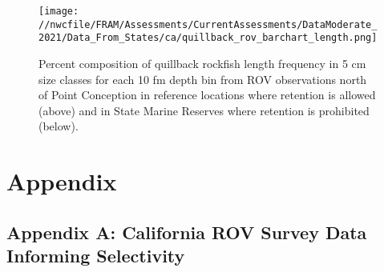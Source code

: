 \documentclass[11pt,
  english,
  a4paper,
]{article}
\begin{document}
\tagmcend\tagstructend


\begin{figure}
\centering
\texttt{[image: //nwcfile/FRAM/Assessments/CurrentAssessments/DataModerate\_2021/Data\_From\_States/ca/quillback\_rov\_barchart\_length.png]}
\caption{Percent composition of quillback rockfish length frequency in 5 cm size classes for each 10 fm depth bin from ROV observations north of Point Conception in reference locations where retention is allowed (above) and in State Marine Reserves where retention is prohibited (below).\label{fig:ca-ROV-percent}}
\end{figure}

\tagmcend\tagstructend

\newpage

\clearpage


\hypertarget{appendix}{%
\section{Appendix}\label{appendix}}

\leavevmode\tagmcend\tagstructend


\hypertarget{appendix-a-california-rov-survey-data-informing-selectivity}{%
\subsection{Appendix A: California ROV Survey Data Informing Selectivity}\label{appendix-a-california-rov-survey-data-informing-selectivity}}

\leavevmode\tagmcend\tagstructend

\end{document}
